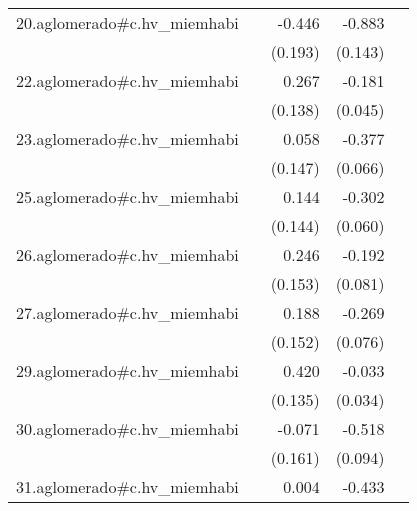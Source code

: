 {\begin{longtable}{l*{4}{D{.}{.}{-1}}}
\addlinespace
20.aglomerado#c.hv\_miemhabi&                     &      -0.446\sym{*}  &      -0.883\sym{***}&                     \\
            &                     &     (0.193)         &     (0.143)         &                     \\
\addlinespace
22.aglomerado#c.hv\_miemhabi&                     &       0.267         &      -0.181\sym{***}&                     \\
            &                     &     (0.138)         &     (0.045)         &                     \\
\addlinespace
23.aglomerado#c.hv\_miemhabi&                     &       0.058         &      -0.377\sym{***}&                     \\
            &                     &     (0.147)         &     (0.066)         &                     \\
\addlinespace
25.aglomerado#c.hv\_miemhabi&                     &       0.144         &      -0.302\sym{***}&                     \\
            &                     &     (0.144)         &     (0.060)         &                     \\
\addlinespace
26.aglomerado#c.hv\_miemhabi&                     &       0.246         &      -0.192\sym{*}  &                     \\
            &                     &     (0.153)         &     (0.081)         &                     \\
\addlinespace
27.aglomerado#c.hv\_miemhabi&                     &       0.188         &      -0.269\sym{***}&                     \\
            &                     &     (0.152)         &     (0.076)         &                     \\
\addlinespace
29.aglomerado#c.hv\_miemhabi&                     &       0.420\sym{**} &      -0.033         &                     \\
            &                     &     (0.135)         &     (0.034)         &                     \\
\addlinespace
30.aglomerado#c.hv\_miemhabi&                     &      -0.071         &      -0.518\sym{***}&                     \\
            &                     &     (0.161)         &     (0.094)         &                     \\
\addlinespace
31.aglomerado#c.hv\_miemhabi&                     &       0.004         &      -0.433\sym{***}&                     \\

\end{longtable}}

